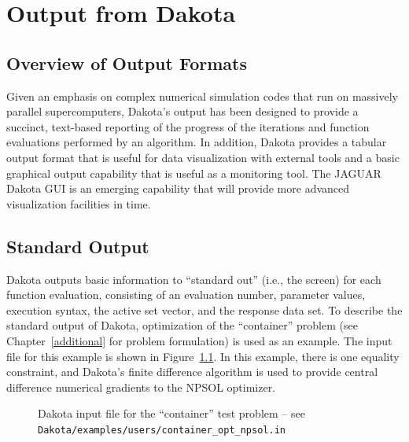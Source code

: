 \chapter{Output from Dakota}\label{output}

\section{Overview of Output Formats}\label{output:overview}

Given an emphasis on complex numerical simulation codes that run on
massively parallel supercomputers, Dakota's output has been designed
to provide a succinct, text-based reporting of the progress of the
iterations and function evaluations performed by an algorithm. In
addition, Dakota provides a tabular output format that is useful for
data visualization with external tools and a basic graphical output
capability that is useful as a monitoring tool. The JAGUAR Dakota GUI
is an emerging capability that will provide more advanced
visualization facilities in time.

\section{Standard Output}\label{output:standard}

Dakota outputs basic information to ``standard out'' (i.e., the
screen) for each function evaluation, consisting of an evaluation
number, parameter values, execution syntax, the active set vector, and
the response data set. To describe the standard output of Dakota,
optimization of the ``container'' problem (see
Chapter~\ref{additional} for problem formulation) is used as an
example. The input file for this example is shown in
Figure~\ref{output:incont}. In this example, there is one equality
constraint, and Dakota's finite difference algorithm is used to
provide central difference numerical gradients to the NPSOL optimizer.
\begin{figure}
  \begin{small}
    \begin{bigbox}
    \end{bigbox}
  \end{small}
  \caption{Dakota input file for the ``container'' test problem --
see \texttt{Dakota/examples/users/container\_opt\_npsol.in} }
  \label{output:incont}
\end{figure}

\clearpage

